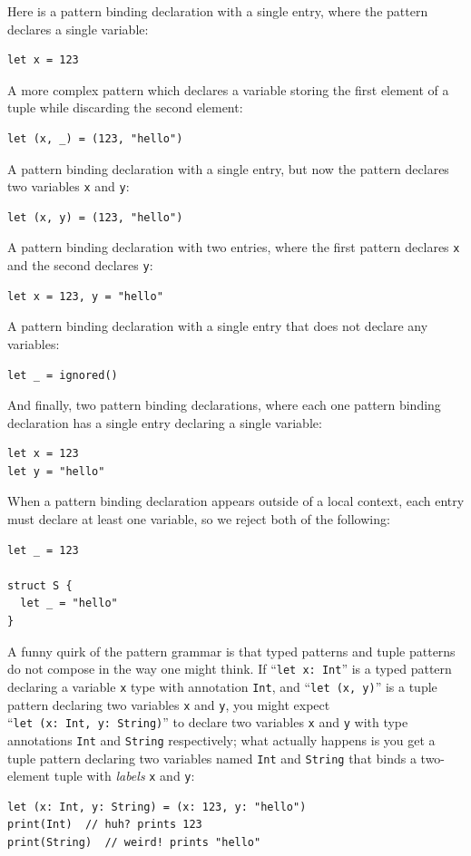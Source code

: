 \documentclass[../generics]{subfiles}
\begin{document}
Here is a pattern binding declaration with a single entry, where the pattern declares a single variable:
\begin{Verbatim}
let x = 123
\end{Verbatim}
A more complex pattern which declares a variable storing the first element of a tuple while discarding the second element:
\begin{Verbatim}
let (x, _) = (123, "hello")
\end{Verbatim}
A pattern binding declaration with a single entry, but now the pattern declares two variables \texttt{x} and \texttt{y}:
\begin{Verbatim}
let (x, y) = (123, "hello")
\end{Verbatim}
A pattern binding declaration with two entries, where the first pattern declares \texttt{x} and the second declares \texttt{y}:
\begin{Verbatim}
let x = 123, y = "hello"
\end{Verbatim}
A pattern binding declaration with a single entry that does not declare any variables:
\begin{Verbatim}
let _ = ignored()
\end{Verbatim}
And finally, two pattern binding declarations, where each one pattern binding declaration has a single entry declaring a single variable:
\begin{Verbatim}
let x = 123
let y = "hello"
\end{Verbatim}
When a pattern binding declaration appears outside of a local context, each entry must declare at least one variable, so we reject both of the following:
\begin{Verbatim}
let _ = 123

struct S {
  let _ = "hello"
}
\end{Verbatim}

A funny quirk of the pattern grammar is that typed patterns and tuple patterns do not compose in the way one might think. If ``\texttt{let x:~Int}'' is a typed pattern declaring a variable \texttt{x} type with annotation \texttt{Int}, and ``\texttt{let (x, y)}'' is a tuple pattern declaring two variables \texttt{x} and \texttt{y}, you might expect ``\texttt{let~(x:~Int,~y:~String)}'' to declare two variables \texttt{x} and \texttt{y} with type annotations \texttt{Int} and \texttt{String} respectively; what actually happens is you get a tuple pattern declaring two variables named \texttt{Int} and \texttt{String} that binds a two-element tuple with \emph{labels} \texttt{x} and \texttt{y}:
\begin{Verbatim}
let (x: Int, y: String) = (x: 123, y: "hello")
print(Int)  // huh? prints 123
print(String)  // weird! prints "hello"
\end{Verbatim}
\end{document}
